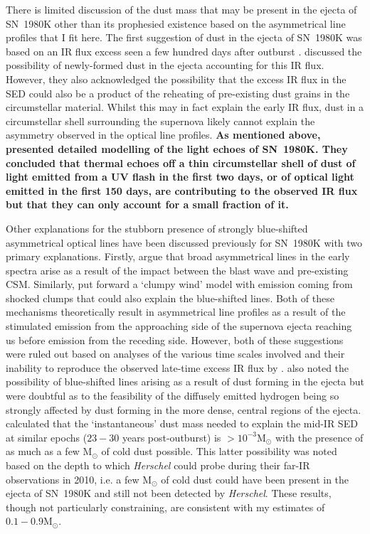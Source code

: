 There is limited discussion of the dust mass that may be present in the ejecta of SN~1980K other than its prophesied existence based on the asymmetrical line profiles that I fit here.  The first suggestion of dust in the ejecta of SN~1980K was based on an IR flux excess seen a few hundred days after outburst \citep{Dwek1983}.  \citet{Dwek1983} discussed the possibility of newly-formed dust in the ejecta accounting for this IR flux. However, they also acknowledged the possibility that the excess IR flux in the SED could also be a product of the reheating of pre-existing dust grains in the circumstellar material.  Whilst this may in fact explain the early IR flux,  dust in a circumstellar shell surrounding the supernova likely cannot explain the asymmetry observed in the optical line profiles. {\bf As mentioned above, \citet{Sugerman2012} presented detailed modelling of the light echoes of SN~1980K.  They concluded that thermal echoes off a thin circumstellar shell of dust of light emitted from a UV flash in the first two days, or of optical light emitted in the first 150 days, are contributing to the observed IR flux but that they can only account for a small fraction of it.}

Other explanations for the stubborn presence of strongly blue-shifted asymmetrical optical lines have been discussed previously for SN~1980K  with two primary explanations.  Firstly, \citet{Fesen1990} argue that broad asymmetrical lines in the early spectra arise as a result of the impact between the blast wave and pre-existing CSM.  Similarly, \citet{Chugai1994} put forward a `clumpy wind' model with emission coming from shocked clumps that could also explain the blue-shifted lines.  Both of these mechanisms theoretically result in asymmetrical line profiles as a result of the stimulated emission from the approaching side of the supernova ejecta reaching us before emission from the receding side.  However, both of these suggestions were ruled out based on analyses of the various time scales involved and their inability to reproduce the observed late-time excess IR flux by \citet{Sugerman2012}.  \citet{Fesen1990}  also noted the possibility of blue-shifted lines  arising as a result of dust forming in the ejecta but were doubtful as to the feasibility of the diffusely emitted hydrogen being so strongly affected by dust forming in the more dense, central regions of the ejecta.  \citet{Sugerman2012} calculated that the `instantaneous' dust mass needed to explain the mid-IR SED at similar epochs ($23-30$ years post-outburst) is $>10^{-3}$M$_{\odot}$ with the presence of as much as a few M$_{\odot}$ of cold dust possible.  This latter possibility was noted based on the depth to which {\em Herschel} could probe during their far-IR observations in 2010, i.e. a few M$_{\odot}$ of cold dust could have been present in the ejecta of SN~1980K and still not been detected by {\em Herschel}.  These results, though not particularly constraining, are consistent with my estimates of $0.1-0.9$M$_{\odot}$.

